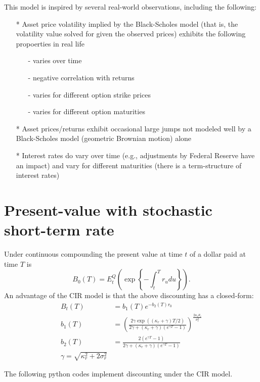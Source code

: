 \documentclass[
]{book}
\begin{document}
This model is inspired by several real-world observations, including the following:

\begin{itemize}
\item[*] Asset price volatility implied by the Black-Scholes model (that is, the volatility value solved for given the observed prices) exhibits the following propoerties in real life
\begin{itemize}
\item[-] varies over time
\item[-] negative correlation with returns
\item[-] varies for different option strike prices
\item[-] varies for different option maturities
\end{itemize}
\item[*] Asset prices/returns exhibit occasional large jumps not modeled well by a Black-Scholes model (geometric Brownian motion) alone
\item[*] Interest rates do vary over time (e.g., adjustments by Federal Reserve have an impact) and vary for different maturities (there is a term-structure of interest rates)
\end{itemize}

\hypertarget{present-value-with-stochastic-short-term-rate}{%
\section{Present-value with stochastic short-term rate}\label{present-value-with-stochastic-short-term-rate}}

Under continuous compounding the present value at time \(t\) of a dollar paid at time \(T\) is
\[B_0(T) = E_t^Q\left(\exp\left\{-\int_t^T r_udu\right\}\right).\]
An advantage of the CIR model is that the above discounting has a closed-form:
\begin{align*}
B_t(T) &= b_1(T)e^{-b_2(T)r_0}\\
b_1(T) &= \left(\frac{2\gamma \exp((\kappa_r+\gamma)T/2)}{2\gamma + (\kappa_r + \gamma)(e^{\gamma T}-1)}\right)^{\frac{2\kappa_r\theta_r}{\sigma_r^2}}\\
b_2(T) &= \frac{2(e^{\gamma T}-1)}{2\gamma + (\kappa_r + \gamma)(e^{\gamma T}-1)}\\
\gamma = \sqrt{\kappa_r^2 + 2\sigma_r^2}
\end{align*}

The following python codes implement discounting under the CIR model.
\end{document}

